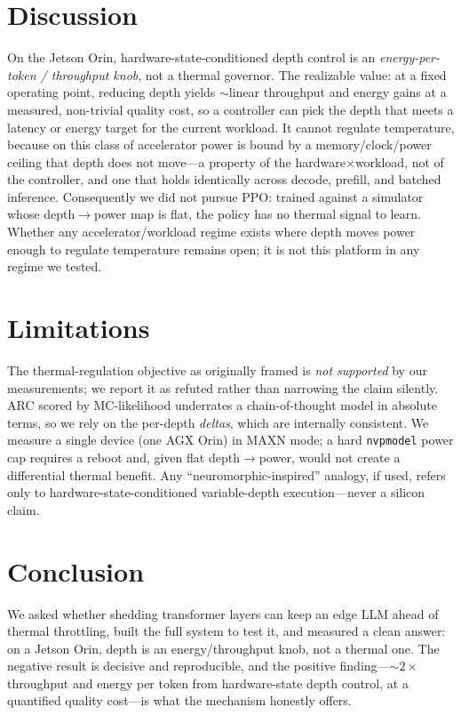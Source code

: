 \documentclass[11pt]{article}
\begin{document}
\section{Discussion}
\label{sec:discussion}
On the Jetson Orin, hardware-state-conditioned depth control is an \emph{energy-per-token /
throughput knob}, not a thermal governor. The realizable value: at a fixed operating point,
reducing depth yields ${\sim}$linear throughput and energy gains at a measured, non-trivial
quality cost, so a controller can pick the depth that meets a latency or energy target for the
current workload. It cannot regulate temperature, because on this class of accelerator power is
bound by a memory/clock/power ceiling that depth does not move---a property of the
hardware$\times$workload, not of the controller, and one that holds identically across decode,
prefill, and batched inference. Consequently we did not pursue PPO: trained against a simulator
whose depth$\to$power map is flat, the policy has no thermal signal to learn. Whether any
accelerator/workload regime exists where depth moves power enough to regulate temperature
remains open; it is not this platform in any regime we tested.

\section{Limitations}
The thermal-regulation objective as originally framed is \emph{not supported} by our
measurements; we report it as refuted rather than narrowing the claim silently. ARC scored by
MC-likelihood underrates a chain-of-thought model in absolute terms, so we rely on the per-depth
\emph{deltas}, which are internally consistent. We measure a single device (one AGX Orin) in
MAXN mode; a hard \texttt{nvpmodel} power cap requires a reboot and, given flat depth$\to$power,
would not create a differential thermal benefit. Any ``neuromorphic-inspired'' analogy, if used,
refers only to hardware-state-conditioned variable-depth execution---never a silicon claim.

\section{Conclusion}
We asked whether shedding transformer layers can keep an edge LLM ahead of thermal throttling,
built the full system to test it, and measured a clean answer: on a Jetson Orin, depth is an
energy/throughput knob, not a thermal one. The negative result is decisive and reproducible, and
the positive finding---${\sim}2\times$ throughput and energy per token from hardware-state depth
control, at a quantified quality cost---is what the mechanism honestly offers.
\end{document}

